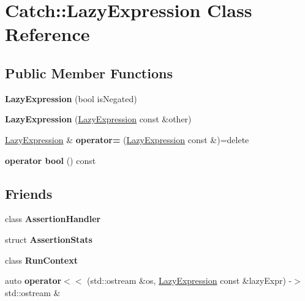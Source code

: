 \hypertarget{classCatch_1_1LazyExpression}{}\section{Catch\+::Lazy\+Expression Class Reference}
\label{classCatch_1_1LazyExpression}
\subsection*{Public Member Functions}
\begin{DoxyCompactItemize}
\item 
\mbox{\label{classCatch_1_1LazyExpression_a47186c2487bd4bf871e870ba8048553a}} 
{\bfseries Lazy\+Expression} (bool is\+Negated)
\item 
\mbox{\label{classCatch_1_1LazyExpression_ab82d5e94df0e159b018fbde0170e46f8}} 
{\bfseries Lazy\+Expression} (\mbox{\hyperlink{classCatch_1_1LazyExpression}{Lazy\+Expression}} const \&other)
\item 
\mbox{\label{classCatch_1_1LazyExpression_ae4ae00d4f36f084c369f2da36565a822}} 
\mbox{\hyperlink{classCatch_1_1LazyExpression}{Lazy\+Expression}} \& {\bfseries operator=} (\mbox{\hyperlink{classCatch_1_1LazyExpression}{Lazy\+Expression}} const \&)=delete
\item 
\mbox{\label{classCatch_1_1LazyExpression_acdb846cb230cecfc6aca7a925b31fbca}} 
{\bfseries operator bool} () const
\end{DoxyCompactItemize}
\subsection*{Friends}
\begin{DoxyCompactItemize}
\item 
\mbox{\label{classCatch_1_1LazyExpression_a4301a3aa57b612dd8b6ef8461742ecab}} 
class {\bfseries Assertion\+Handler}
\item 
\mbox{\label{classCatch_1_1LazyExpression_a64019eb137f5ce447cdc71cb80b6e7a4}} 
struct {\bfseries Assertion\+Stats}
\item 
\mbox{\label{classCatch_1_1LazyExpression_af3aa096bb29a772bc534830f29a2ce7a}} 
class {\bfseries Run\+Context}
\item 
\mbox{\label{classCatch_1_1LazyExpression_aa01086581cab2fcd2d4580b8fa787dfc}} 
auto {\bfseries operator$<$$<$} (std\+::ostream \&os, \mbox{\hyperlink{classCatch_1_1LazyExpression}{Lazy\+Expression}} const \&lazy\+Expr) -\/$>$ std\+::ostream \&
\end{DoxyCompactItemize}


